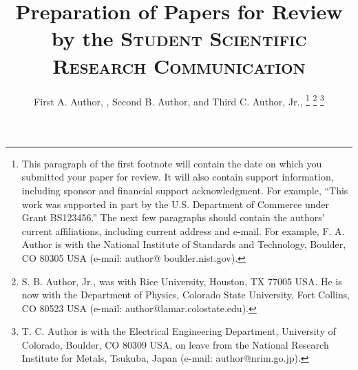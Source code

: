\documentclass{IEEEtran}
\begin{document}
\title{Preparation of Papers for Review by the \textsc{Student Scientific Research Communication}}
\author{First A. Author, , Second B. Author, and Third C. Author, Jr., 
\thanks{This paragraph of the first footnote will contain the
date on which you submitted your paper for review. It will also contain
support information, including sponsor and financial support acknowledgment.
For example, ``This work was supported in part by the U.S. Department of
Commerce under Grant BS123456.'' The next few paragraphs should contain the
authors' current affiliations, including current address and e-mail. For
example, F. A. Author is with the National Institute of Standards and
Technology, Boulder, CO 80305 USA (e-mail: author@ boulder.nist.gov).}
\thanks{S. B. Author, Jr., was with Rice University, Houston, TX 77005 USA. He is
now with the Department of Physics, Colorado State University, Fort Collins,
CO 80523 USA (e-mail: author@lamar.colostate.edu).}
\thanks{T. C. Author is with
the Electrical Engineering Department, University of Colorado, Boulder, CO
80309 USA, on leave from the National Research Institute for Metals,
Tsukuba, Japan (e-mail: author@nrim.go.jp).}}

\maketitle
\end{document}
